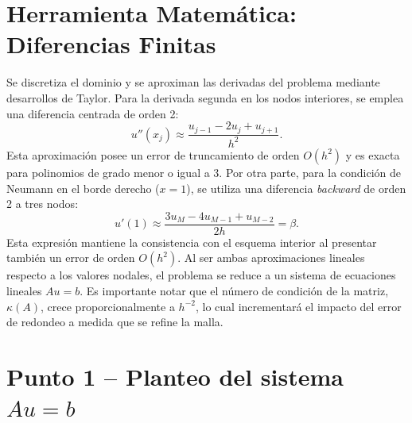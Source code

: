 \documentclass[]{report}
\begin{document}
\section*{Herramienta Matemática: Diferencias Finitas}

Se discretiza el dominio y se aproximan las derivadas del problema mediante desarrollos de Taylor. Para la derivada segunda en los nodos interiores, se emplea una diferencia centrada de orden 2:
\begin{equation}
u''(x_j)\approx\frac{u_{j-1}-2u_j+u_{j+1}}{h^2}.
\label{eq:centrada}
\end{equation}
Esta aproximación posee un error de truncamiento de orden $O(h^2)$ y es exacta para polinomios de grado menor o igual a 3. Por otra parte, para la condición de Neumann en el borde derecho ($x=1$), se utiliza una diferencia \textit{backward} de orden 2 a tres nodos:
\begin{equation}
u'(1)\approx\frac{3u_M-4u_{M-1}+u_{M-2}}{2h}=\beta.
\label{eq:backward}
\end{equation}
Esta expresión mantiene la consistencia con el esquema interior al presentar también un error de orden $O(h^2)$. Al ser ambas aproximaciones lineales respecto a los valores nodales, el problema se reduce a un sistema de ecuaciones lineales $Au=b$. Es importante notar que el número de condición de la matriz, $\kappa(A)$, crece proporcionalmente a $h^{-2}$, lo cual incrementará el impacto del error de redondeo a medida que se refine la malla.

\pagebreak


\section*{Punto 1 -- Planteo del sistema $Au=b$}
\end{document}
